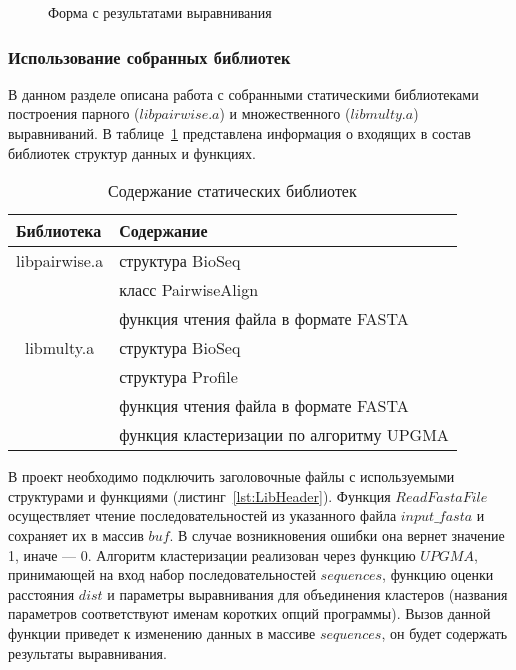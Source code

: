 \begin{figure}[h]
	\caption{Форма с результатами выравнивания}
	\label{ris:webkares}
\end{figure}

\subsubsection[Использование собранных библиотек]{\large Использование собранных библиотек}
\hspace{\parindent} В данном разделе описана работа с собранными статическими библиотеками построения парного ($libpairwise.a$) и множественного ($libmulty.a$) выравниваний. В таблице~\ref{tabular:staticlibs} представлена информация о входящих в состав библиотек структур данных и функциях.

\begin{table}[h]
\caption{Содержание статических библиотек}
\centering
\begin{tabular}{|l|l|}
\hline
Библиотека & Содержание \\ \hline
\multicolumn{ 1}{|c|}{libpairwise.a} & структура BioSeq \\ \cline{ 2- 2}
\multicolumn{ 1}{|l|}{} & класс PairwiseAlign \\ \cline{ 2- 2}
\multicolumn{ 1}{|l|}{} & функция чтения файла в формате FASTA \\ \hline
\multicolumn{ 1}{|c|}{libmulty.a} & структура BioSeq \\ \cline{ 2- 2}
\multicolumn{ 1}{|l|}{} & структура Profile \\ \cline{ 2- 2}
\multicolumn{ 1}{|l|}{} & функция чтения файла в формате FASTA \\ \cline{ 2- 2}
\multicolumn{ 1}{|l|}{} & функция кластеризации по алгоритму UPGMA \\ \hline
\end{tabular}
\label{tabular:staticlibs}
\end{table}

В проект необходимо подключить заголовочные файлы с используемыми структурами и функциями (листинг~\ref{lst:LibHeader}). Функция $ReadFastaFile$ осуществляет чтение последовательностей из указанного файла $input\_fasta$ и сохраняет их в массив $buf$. В случае возникновения ошибки она вернет значение 1, иначе --- 0. Алгоритм кластеризации реализован через функцию $UPGMA$, принимающей на вход набор последовательностей $sequences$, функцию оценки расстояния $dist$ и параметры выравнивания для объединения кластеров (названия параметров соответствуют именам коротких опций программы). Вызов данной функции приведет к изменению данных в массиве $sequences$, он будет содержать результаты выравнивания.

